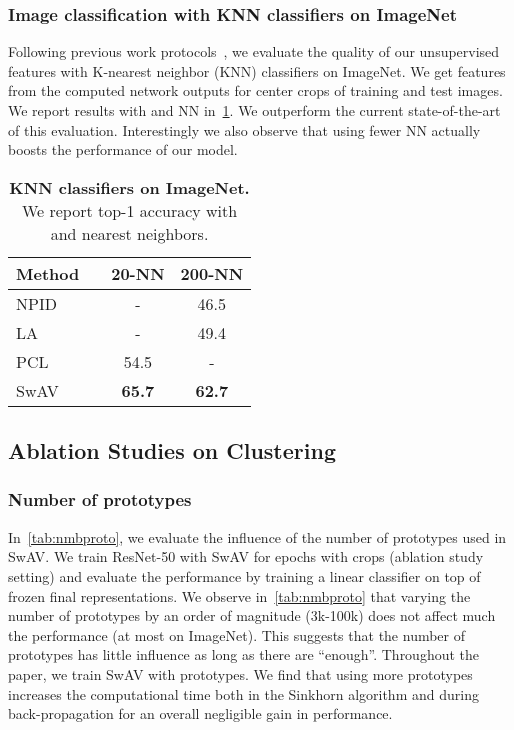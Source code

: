 \documentclass{article}
\def\OURS{SwAV\xspace}
\newcommand{\ImNet}{ImageNet\xspace}
\begin{document}
\subsubsection{Image classification with KNN classifiers on \ImNet}
Following previous work protocols~\cite{wu2018unsupervised,zhuang2019local}, we evaluate the quality of our unsupervised features with K-nearest neighbor (KNN) classifiers on ImageNet.
We get features from the computed network outputs for center crops of training and test images.
We report results with  and  NN in~\cref{tab:knn}.
We outperform the current state-of-the-art of this evaluation.
Interestingly we also observe that using fewer NN actually boosts the performance of our model.
\begin{table}[h]
  \caption{
\textbf{KNN classifiers on ImageNet.} We report top-1 accuracy with  and  nearest neighbors.
}
\vspace{.3em}
  \label{tab:knn}
\centering
\begin{tabular}{ll c c}
    \toprule
	  Method && 20-NN & 200-NN \\
    \midrule
	NPID~\cite{wu2018unsupervised} && - & 46.5 \\
	LA~\cite{zhuang2019local} && - & 49.4 \\
	PCL~\cite{li2020prototypical} && 54.5 & - \\
    \midrule
	\OURS && \bf 65.7 & \bf 62.7 \\
    \bottomrule
  \end{tabular}
\end{table}

\subsection{Ablation Studies on Clustering}
\label{ap:ablation}

\subsubsection{Number of prototypes}
In~\cref{tab:nmbproto}, we evaluate the influence of the number of prototypes used in \OURS.
We train ResNet-50 with \OURS for  epochs with  crops (ablation study setting) and evaluate the performance by training a linear classifier on top of frozen final representations.
We observe in~\cref{tab:nmbproto} that varying the number of prototypes by an order of magnitude (3k-100k) does not affect much the performance (at most  on ImageNet).
This suggests that the number of prototypes has little influence as long as there are ``enough''.
Throughout the paper, we train \OURS with  prototypes.
We find that using more prototypes increases the computational time both in the Sinkhorn algorithm and during back-propagation for an overall negligible gain in performance.
\end{document}
